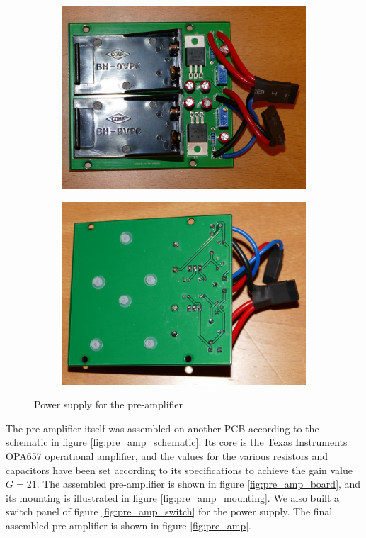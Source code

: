 \documentclass[a4paper]{article}
\begin{document}
\begin{appendices}
\begin{figure}[ht!]
\centering
\begin{subfigure}[t]{0.48\textwidth}
\includegraphics[width=\textwidth]{fig/P1170891-cropped.jpg}
\end{subfigure}
%
\begin{subfigure}[t]{0.48\textwidth}
\includegraphics[width=\textwidth]{fig/P1170894-cropped.jpg}
\end{subfigure}
%
\caption{Power supply for the pre-amplifier}
\label{fig:pre_amp_psu}
\end{figure}

\FloatBarrier
The pre-amplifier itself was assembled on another PCB according to the schematic in figure \ref{fig:pre_amp_schematic}.
Its core is the
\href{https://www.ti.com/product/OPA657}{Texas Instruments OPA657}
\href{https://en.wikipedia.org/wiki/Operational_amplifier}{operational amplifier},
and the values for the various resistors and capacitors have been set according to its specifications to achieve the gain value $G = 21$.
The assembled pre-amplifier is shown in figure \ref{fig:pre_amp_board}, and its mounting is illustrated in figure \ref{fig:pre_amp_mounting}.
We also built a switch panel of figure \ref{fig:pre_amp_switch} for the power supply.
The final assembled pre-amplifier is shown in figure \ref{fig:pre_amp}.



\end{appendices}
\end{document}
